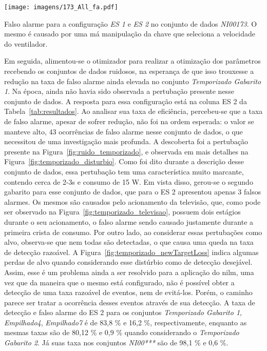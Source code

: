\begin{SidewaysFigure}
\centering
\texttt{[image: imagens/173\_All\_fa.pdf]}
\caption[Falso alarme para a configuração \emph{ES 1} e \emph{ES 2} no
conjunto de dados \emph{NI00173}.]{Falso alarme para a configuração
\emph{ES 1} e \emph{ES 2} no conjunto de dados \emph{NI00173}. O mesmo
é causado por uma má manipulação da chave que seleciona a
velocidade do ventilador.}
\label{fig:ni173_fa}
\end{SidewaysFigure}

Em seguida, alimentou-se o otimizador para realizar a otimização dos
parâmetros recebendo os conjuntos de dados ruidosos, na esperança de
que isso trouxesse a redução na taxa de falso alarme ainda elevada no
conjunto \emph{Temporizado Gabarito 1}. Na época, ainda não havia sido
observada a pertubação presente nesse conjunto de dados. A resposta
para essa configuração está na coluna ES 2 da
Tabela~\ref{tab:resultados}. Ao analisar sua taxa de eficiência,
percebeu-se que a taxa de falso alarme, apesar de sofrer redução, não
foi na ordem esperada: o valor se manteve alto, 43 ocorrências de
falso alarme nesse conjunto de dados, o que necessitou de uma
investigação mais profunda.  A descoberta foi a pertubação presente na
Figura~\ref{fig:ruido_temporizado}, e observada em mais detalhes na
Figura~\ref{fig:temporizado_disturbio}. Como foi dito durante a
descrição desse conjunto de dados, essa pertubação tem uma
característica muito marcante, contendo cerca de 2-3s e consumo de 15
W. Em vista disso, gerou-se o segundo gabarito para esse conjunto de
dados, que para o ES 2 apresentou apenas 3 falsos alarmes. Os mesmos
são causados pelo acionamento da televisão, que, como pode ser
observado na Figura~\ref{fig:temporizado_televisao}, possuem dois
estágios durante o seu acionamento, o falso alarme sendo causado
justamente durante a primeira crista de consumo. Por outro lado, ao
considerar essas pertubações como alvo, observa-se que nem todas são
detectadas, o que causa uma queda na taxa de detecção razoável. A
Figura~\ref{fig:temporizado_newTargetLoss} indica algumas perdas de
alvo quando considerando esse distúrbio como de detecção desejável.
Assim, esse é um problema ainda a ser resolvido para a aplicação do
\acs{nilm}, uma vez que da maneira que o mesmo está configurado, não é
possível obter a detecção de uma taxa razoável de eventos, nem de
evitá-los. Porém, o caminho parece ser tratar a ocorrência desses
eventos através de sua detecção. A taxa de detecção e falso alarme do
ES 2 para os conjuntos \emph{Temporizado Gabarito 1},
\emph{Empilhado4}, \emph{Empilhado7} é de 83,8 \% e 16,2 \%,
respectivamente, enquanto as mesmas taxas são de 80,12 \% e 0,9 \%
quando considerando o \emph{Temporizado Gabarito 2}. Já suas taxa
nos conjuntos \emph{NI00***} são de 98,1 \% e 0,6 \%.

